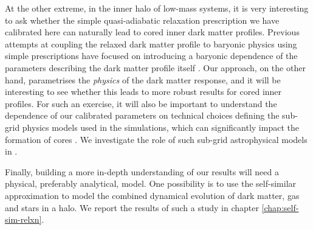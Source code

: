 At the other extreme, in the inner halo of low-mass systems, it is very interesting to ask whether the simple quasi-adiabatic relaxation prescription we have calibrated here can naturally lead to cored inner dark matter profiles. Previous attempts at coupling the relaxed dark matter profile to baryonic physics using simple prescriptions have focused on introducing a baryonic dependence of the parameters describing the dark matter profile itself \citep[e.g.,][]{2014MNRAS.441.2986D}. Our approach, on the other hand, parametrises the \emph{physics} of the dark matter response, and it will be interesting to see whether this leads to more robust results for cored inner profiles. For such an exercise, it will also be important to understand the dependence of our calibrated parameters on technical choices defining the sub-grid physics models used in the simulations, which can significantly impact the formation of cores \citep{bfln18}. We investigate the role of such sub-grid astrophysical models in .

Finally, building a more in-depth understanding of our results will need a physical, preferably analytical, model. One possibility is to use the self-similar approximation \citep[][]{fg84,bertschinger85,launagai+15,shi16} to model the combined dynamical evolution of dark matter, gas and stars in a halo. We report the results of such a study in chapter \ref{chap:self-sim-relxn}.

 

